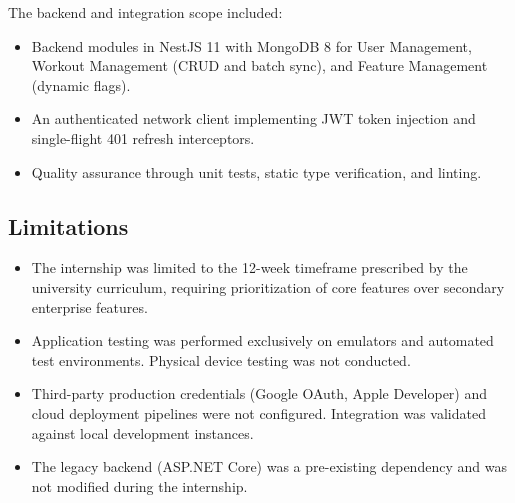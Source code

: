 The backend and integration scope included:
\begin{itemize}
    \item Backend modules in NestJS 11 with MongoDB 8 for User Management, Workout Management (CRUD and batch sync), and Feature Management (dynamic flags).
    \item An authenticated network client implementing JWT token injection and single-flight 401 refresh interceptors.
    \item Quality assurance through unit tests, static type verification, and linting.
\end{itemize}

\subsection{Limitations}
\begin{itemize}
    \item The internship was limited to the 12-week timeframe prescribed by the university curriculum, requiring prioritization of core features over secondary enterprise features.
    \item Application testing was performed exclusively on emulators and automated test environments. Physical device testing was not conducted.
    \item Third-party production credentials (Google OAuth, Apple Developer) and cloud deployment pipelines were not configured. Integration was validated against local development instances.
    \item The legacy backend (ASP.NET Core) was a pre-existing dependency and was not modified during the internship.
\end{itemize}

